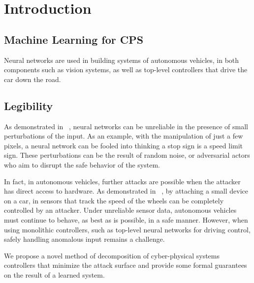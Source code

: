 \section{Introduction}

\subsection{Machine Learning for CPS}

Neural networks are used in building systems of autonomous vehicles, in both components such as vision systems, as well as top-level controllers that drive the car down the road.

\subsection{Legibility}

As demonstrated in ~\cite{NNLegibility}, neural networks can be unreliable in the presence of small perturbations of the input.
As an example, with the manipulation of just a few pixels, a neural network can be fooled into thinking a stop sign is a speed limit sign.
These perturbations can be the result of random noise, or adversarial actors who aim to disrupt the safe behavior of the system.

In fact, in autonomous vehicles, further attacks are possible when the attacker has direct access to hardware.
As demonstrated in ~\cite{brakeHack}, by attaching a small device on a car, in sensors that track the speed of the wheels can be completely controlled by an attacker.
Under unreliable sensor data, autonomous vehicles must continue to behave, as best as is possible, in a safe manner.
However, when using monolithic controllers, such as top-level neural networks for driving control, safely handling anomalous input remains a challenge.

We propose a novel method of decomposition of cyber-physical systems controllers that minimize the attack surface and provide some formal guarantees on the result of a learned system.
